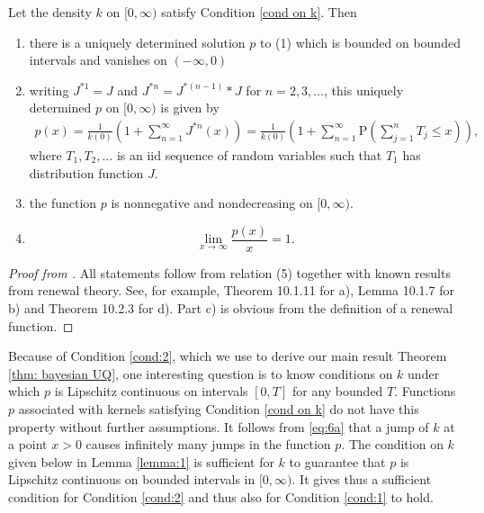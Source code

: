 \begin{lemma}
Let the density $k$ on $[0,\infty)$ satisfy Condition \ref{cond on k}. Then
\begin{enumerate}[label=\alph*)]
    \item there is a uniquely determined solution $p$ to (1) which is bounded on bounded intervals and vanishes on $(-\infty, 0)$
    \item writing $J^{*1} = J$ and $J^{*n} = J^{*(n-1)} * J$ for $n=2,3,\dots$, this uniquely determined $p$ on $[0,\infty)$ is given by
    \begin{align}\label{eq:6a}
    	p(x) = \frac{1}{k(0)} \left( 1 + \sum_{n=1}^\infty J^{*n}(x) \right) = \frac{1}{k(0)} \left( 1 + \sum_{n=1}^\infty \mathrm{P}\left(\sum_{j=1}^n T_j \le x \right) \right), 
    \end{align}
    where $T_1, T_2, \dots$ is an iid sequence of random variables such that $T_1$ has distribution function $J$.
    \item the function $p$ is nonnegative and nondecreasing on $[0,\infty)$.
    \item \[\lim_{x \to \infty} \frac{p(x)}{x} = 1. \]
\end{enumerate}
\end{lemma}
\begin{proof}[Proof from \cite{106}] 
All statements follow from relation (5) together with known results from renewal theory. See, for example, \cite{105} Theorem 10.1.11 for a), Lemma 10.1.7 for b) and Theorem 10.2.3 for d). Part c) is obvious from the definition of a renewal function.
\end{proof}

Because of Condition \ref{cond:2}, which we use to derive our main result Theorem \ref{thm: bayesian UQ}, one interesting question is to know conditions on $k$ under which $p$ is Lipschitz continuous on intervals $[0, T]$ for any bounded $T$. Functions $p$ associated with kernels satisfying Condition \ref{cond on k} do not have this property without further assumptions. It follows from \eqref{eq:6a} that a jump of $k$ at a point $x > 0$ causes infinitely many jumps in the function $p$. The condition on $k$ given below in Lemma \ref{lemma:1} is sufficient for $k$ to guarantee that $p$ is Lipschitz continuous on bounded intervals in $[0, \infty)$. It gives thus a sufficient condition for Condition \ref{cond:2} and thus also for Condition \ref{cond:1} to hold.

